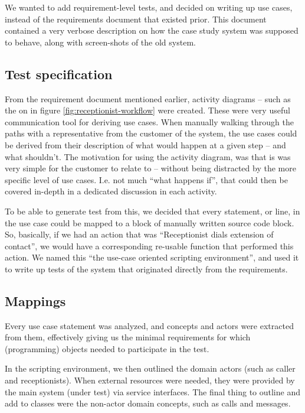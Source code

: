 \noindent We wanted to add requirement-level tests, and decided on writing up use cases, instead of the requirements document that existed prior. This document contained a very verbose description on how the case study system was supposed to behave, along with screen-shots of the old system.

\subsection{Test specification}
\label{sec:1st-iteration-test-specification}
From the requirement document mentioned earlier, activity diagrams -- such as the on in figure \ref{fig:receptionist-workflow} were created. These were very useful communication tool for deriving use cases. When manually walking through the paths with a representative from the customer of the system, the use cases could be derived from their description of what would happen at a given step -- and what shouldn't. The motivation for using the activity diagram, was that is was very simple for the customer to relate to -- without being distracted by the more specific level of use cases. I.e. not much ``what happens if'', that could then be covered in-depth in a dedicated discussion in each activity. \medskip

\noindent To be able to generate test from this, we decided that every statement, or line, in the use case could be mapped to a block of manually written source code block. So, basically, if we had an action that was ``Receptionist dials extension of contact'', we would have a corresponding re-usable function that performed this action. We named this ``the use-case oriented scripting environment'', and used it to write up tests of the system that originated directly from the requirements.

\subsection{Mappings}
Every use case statement was analyzed, and concepts and actors were extracted from them, effectively giving us the minimal requirements for which (programming) objects needed to participate in the test.\medskip

\noindent In the scripting environment, we then outlined the domain actors (such as caller and receptionists). When external resources were needed, they were provided by the main system (under test) via service interfaces. The final thing to outline and add to classes were the non-actor domain concepts, such as calls and messages.\medskip

